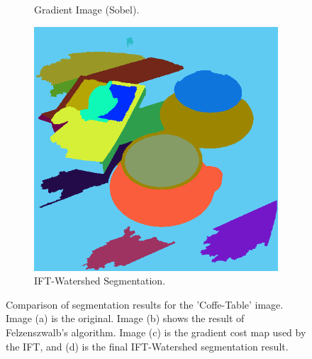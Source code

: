 \documentclass{sbc2023}
\begin{document}
\begin{figure}[H]
\begin{subfigure}[b]{0.16\textwidth}
            \caption{Gradient Image (Sobel).}
            \label{fig:coffe_gradient}
        \end{subfigure}
    \hfill
        \begin{subfigure}[b]{0.15\textwidth}
            \includegraphics[width=\textwidth]{imgs/coffe-tableGray_ift_watershed.png}
            \caption{IFT-Watershed Segmentation.}
            \label{fig:coffe_ift}
        \end{subfigure}
    \caption{Comparison of segmentation results for the 'Coffe-Table' image. Image (a) is the original. Image (b) shows the result of Felzenszwalb's algorithm. Image (c) is the gradient cost map used by the IFT, and (d) is the final IFT-Watershed segmentation result.}
    \label{fig:segmentation_comparison_coffe}
    \end{figure}
\end{document}
